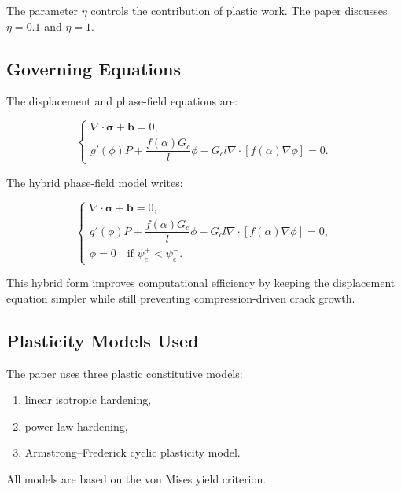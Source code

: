 \documentclass[11pt,a4paper]{article}
\begin{document}
The parameter $\eta$ controls the contribution of plastic work. The paper discusses $\eta=0.1$ and $\eta=1$.

\subsection{Governing Equations}

The displacement and phase-field equations are:

\begin{equation}
\begin{cases}
\nabla \cdot \bm{\sigma} + \bm{b} = 0,\\[4pt]
g'(\phi)P
+
\dfrac{f(\alpha)G_c}{l}\phi
-
G_cl\nabla \cdot
\left[
 f(\alpha)\nabla \phi
\right]
=0.
\end{cases}
\end{equation}

The hybrid phase-field model writes:

\begin{equation}
\begin{cases}
\nabla \cdot \bm{\sigma} + \bm{b} = 0,\\[4pt]
g'(\phi)P
+
\dfrac{f(\alpha)G_c}{l}\phi
-
G_cl\nabla \cdot
\left[
 f(\alpha)\nabla \phi
\right]
=0,\\[4pt]
\phi=0 \quad \text{if } \psi_e^+ < \psi_e^- .
\end{cases}
\end{equation}

This hybrid form improves computational efficiency by keeping the displacement equation simpler while still preventing compression-driven crack growth.

\subsection{Plasticity Models Used}

The paper uses three plastic constitutive models:

\begin{enumerate}
    \item linear isotropic hardening,
    \item power-law hardening,
    \item Armstrong--Frederick cyclic plasticity model.
\end{enumerate}

All models are based on the von Mises yield criterion.
\end{document}
